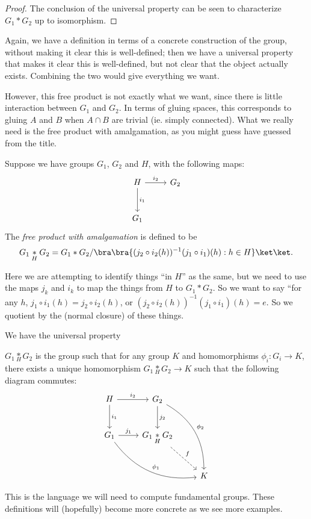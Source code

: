 \documentclass[a4paper]{article}
\begin{document}
\begin{proof}
  The conclusion of the universal property can be seen to characterize $G_1 * G_2$ up to isomorphism.
\end{proof}

Again, we have a definition in terms of a concrete construction of the group, without making it clear this is well-defined; then we have a universal property that makes it clear this is well-defined, but not clear that the object actually exists. Combining the two would give everything we want.

However, this free product is not exactly what we want, since there is little interaction between $G_1$ and $G_2$. In terms of gluing spaces, this corresponds to gluing $A$ and $B$ when $A \cap B$ are trivial (ie. simply connected). What we really need is the free product with amalgamation, as you might guess have guessed from the title.

\begin{defi}
  Suppose we have groups $G_1$, $G_2$ and $H$, with the following maps:
  \[
    \begin{tikzcd}[row sep=large]
      H \ar[r, "i_2"] \ar[d, "i_1"] & G_2\\
      G_1
    \end{tikzcd}
  \]
  The \emph{free product with amalgamation} is defined to be
  \[
    G_1 \underset{H}{*} G_2 = G_1 * G_2/ \bra \bra \{(j_2 \circ i_2(h))^{-1} (j_1 \circ i_1)(h): h\in H\}\ket \ket.
  \]
\end{defi}
Here we are attempting to identify things ``in $H$'' as the same, but we need to use the maps $j_k$ and $i_k$ to map the things from $H$ to $G_1 * G_2$. So we want to say ``for any $h$, $j_1 \circ i_1 (h) = j_2 \circ i_2(h)$, or $(j_2 \circ i_2(h))^{-1} (j_1 \circ i_1)(h) = e$. So we quotient by the (normal closure) of these things.

We have the universal property
\begin{lemma}
  $G_1 \underset{H}{*} G_2$ is the group such that for any group $K$ and homomorphisms $\phi_i: G_i \to K$, there exists a unique homomorphism $G_1 \underset{H}{*} G_2 \to K$ such that the following diagram commutes:
  \[
    \begin{tikzcd}[row sep=large]
      H \ar[r, "i_2"] \ar[d, "i_1"] & G_2 \ar[rdd, bend left, "\phi_2"] \ar[d, "j_2"]\\
      G_1 \ar[rrd, bend right, "\phi_1"] \ar [r, "j_1"] & G_1 \underset{H}{*} G_2 \ar [rd, dashed, "f"]\\
      && K
    \end{tikzcd}
  \]
\end{lemma}
This is the language we will need to compute fundamental groups. These definitions will (hopefully) become more concrete as we see more examples.
\end{document}
